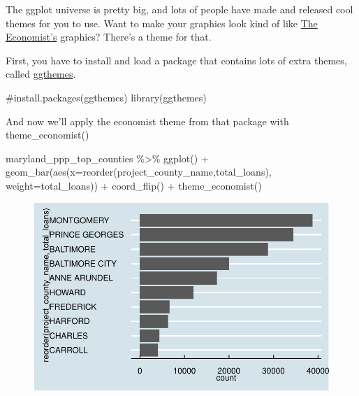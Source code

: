 \documentclass[
  letterpaper,
  DIV=11,
  numbers=noendperiod]{scrreprt}
\newenvironment{Shaded}{\begin{snugshade}}{\end{snugshade}}
\newcommand{\AttributeTok}[1]{\textcolor[rgb]{0.40,0.45,0.13}{#1}}
\newcommand{\CommentTok}[1]{\textcolor[rgb]{0.37,0.37,0.37}{#1}}
\newcommand{\FunctionTok}[1]{\textcolor[rgb]{0.28,0.35,0.67}{#1}}
\newcommand{\NormalTok}[1]{\textcolor[rgb]{0.00,0.23,0.31}{#1}}
\newcommand{\SpecialCharTok}[1]{\textcolor[rgb]{0.37,0.37,0.37}{#1}}
\begin{document}
The ggplot universe is pretty big, and lots of people have made and
released cool themes for you to use. Want to make your graphics look
kind of like \href{https://www.economist.com/}{The Economist's}
graphics? There's a theme for that.

First, you have to install and load a package that contains lots of
extra themes, called
\href{https://yutannihilation.github.io/allYourFigureAreBelongToUs/ggthemes/}{ggthemes}.

\begin{Shaded}
\begin{Highlighting}[]
\CommentTok{\#install.packages(\textquotesingle{}ggthemes\textquotesingle{})}
\FunctionTok{library}\NormalTok{(ggthemes)}
\end{Highlighting}
\end{Shaded}

And now we'll apply the economist theme from that package with
theme\_economist()

\begin{Shaded}
\begin{Highlighting}[]
\NormalTok{maryland\_ppp\_top\_counties }\SpecialCharTok{\%\textgreater{}\%}
  \FunctionTok{ggplot}\NormalTok{() }\SpecialCharTok{+}
  \FunctionTok{geom\_bar}\NormalTok{(}\FunctionTok{aes}\NormalTok{(}\AttributeTok{x=}\FunctionTok{reorder}\NormalTok{(project\_county\_name,total\_loans), }\AttributeTok{weight=}\NormalTok{total\_loans)) }\SpecialCharTok{+}
  \FunctionTok{coord\_flip}\NormalTok{() }\SpecialCharTok{+}
  \FunctionTok{theme\_economist}\NormalTok{()}
\end{Highlighting}
\end{Shaded}

\begin{figure}[H]

{\centering \includegraphics{./visualizing-for-reporting_files/figure-pdf/unnamed-chunk-10-1.pdf}

}

\end{figure}
\end{document}
